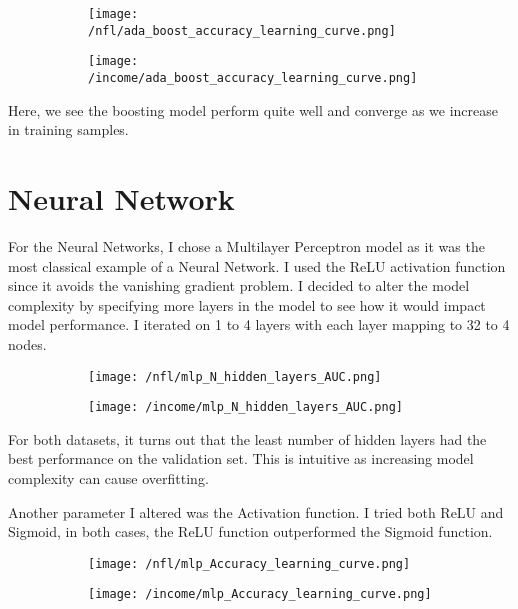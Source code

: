 \documentclass[12pt]{article}
\begin{document}
 \begin{figure}[H]
\begin{subfigure}{0.5\textwidth}
\centering
\texttt{[image: /nfl/ada\_boost\_accuracy\_learning\_curve.png]}
\end{subfigure}%
\begin{subfigure}{0.5\textwidth}
\centering
\texttt{[image: /income/ada\_boost\_accuracy\_learning\_curve.png]}
\end{subfigure}
\end{figure}

Here, we see the boosting model perform quite well and converge as we increase in training samples.

\section{Neural Network}
For the Neural Networks, I chose a Multilayer Perceptron model as it was the most classical example of a Neural Network. I used the ReLU activation function since it avoids the vanishing gradient problem. I decided to alter the model complexity by specifying more layers in the model to see how it would impact model performance. I iterated on 1 to 4 layers with each layer mapping to 32 to 4 nodes.  

\begin{figure}[H]
\begin{subfigure}{0.5\textwidth}
\centering
\texttt{[image: /nfl/mlp\_N\_hidden\_layers\_AUC.png]}
\end{subfigure}%
\begin{subfigure}{0.5\textwidth}
\centering
\texttt{[image: /income/mlp\_N\_hidden\_layers\_AUC.png]}
\end{subfigure}
\end{figure}

For both datasets, it turns out that the least number of hidden layers had the best performance on the validation set. This is intuitive as increasing model complexity can cause overfitting. 

Another parameter I altered was the Activation function. I tried both ReLU and Sigmoid, in both cases, the ReLU function outperformed the Sigmoid function.

\begin{figure}[H]
\begin{subfigure}{0.5\textwidth}
\centering
\texttt{[image: /nfl/mlp\_Accuracy\_learning\_curve.png]}
\end{subfigure}%
\begin{subfigure}{0.5\textwidth}
\centering
\texttt{[image: /income/mlp\_Accuracy\_learning\_curve.png]}
\end{subfigure}
\end{figure}
\end{document}

